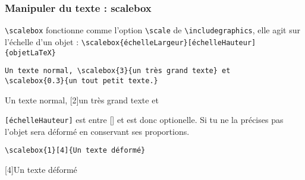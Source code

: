 \documentclass[10pt,hyperref={pdfpagemode=FullScreen},xcolor=dvipsnames,xcolor=table, xcolor=svgnames]{beamer}%
\begin{document}
 \begin{frame}[fragile]
   \frametitle{Manipuler du texte : scalebox}
{\color{blue}\verb!\scalebox!} fonctionne comme l'option {\color{blue}\verb!\scale!} de {\color{blue}\verb!\includegraphics!}, elle agit sur l'échelle d'un objet :
{\color{blue}\verb!\scalebox{échelleLargeur}[échelleHauteur]{objetLaTeX}!}\par
\begin{exampleblock}{}
\begin{verbatim}
Un texte normal, \scalebox{3}{un très grand texte} et
\scalebox{0.3}{un tout petit texte.}
\end{verbatim}
\end{exampleblock}
\begin{block}{}
Un texte normal, \scalebox{3}[2]{un très grand texte} et \scalebox{0.3}{un tout petit texte.}
\end{block}
{\color{blue}\verb![échelleHauteur]!} est entre [] et est donc optionelle. Si tu ne la précises pas l'objet sera déformé en conservant ses proportions.
\begin{exampleblock}{}
\begin{verbatim}
\scalebox{1}[4]{Un texte déformé}
\end{verbatim}
\end{exampleblock}
\begin{block}{}
\scalebox{1}[4]{Un texte déformé}
\end{block}
\end{frame}
\end{document}
